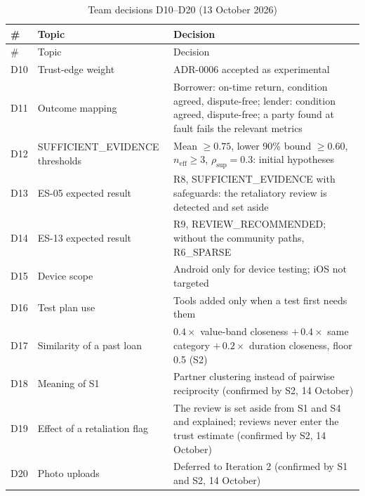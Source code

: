 \begingroup
\begin{longtable}{@{}L{26pt}L{136pt}L{213pt}@{}}
\caption{Team decisions D10--D20 (13 October 2026)}\label{tab:team-decisions-d10-d20}\\
\toprule
\# & Topic & Decision \\
\midrule
\endfirsthead
\toprule
\# & Topic & Decision \\
\midrule
\endhead
\bottomrule
\endlastfoot
D10 & Trust-edge weight & ADR-0006 accepted as experimental \\
D11 & Outcome mapping & Borrower: on-time return, condition agreed, dispute-free; lender: condition agreed, dispute-free; a party found at fault fails the relevant metrics \\
D12 & SUFFICIENT\_EVIDENCE thresholds & Mean $\geq 0.75$, lower 90\% bound $\geq 0.60$, $n_{\mathrm{eff}} \geq 3$, $\rho_{\mathrm{sup}} = 0.3$: initial hypotheses \\
D13 & ES-05 expected result & R8, SUFFICIENT\_EVIDENCE with safeguards: the retaliatory review is detected and set aside \\
D14 & ES-13 expected result & R9, REVIEW\_RECOMMENDED; without the community paths, R6\_SPARSE \\
D15 & Device scope & Android only for device testing; iOS not targeted \\
D16 & Test plan use & Tools added only when a test first needs them \\
D17 & Similarity of a past loan & $0.4\times$ value-band closeness $+\,0.4\times$ same category $+\,0.2\times$ duration closeness, floor 0.5 (S2) \\
D18 & Meaning of S1 & Partner clustering instead of pairwise reciprocity (confirmed by S2, 14 October) \\
D19 & Effect of a retaliation flag & The review is set aside from S1 and S4 and explained; reviews never enter the trust estimate (confirmed by S2, 14 October) \\
D20 & Photo uploads & Deferred to Iteration 2 (confirmed by S1 and S2, 14 October) \\
\end{longtable}
\endgroup
